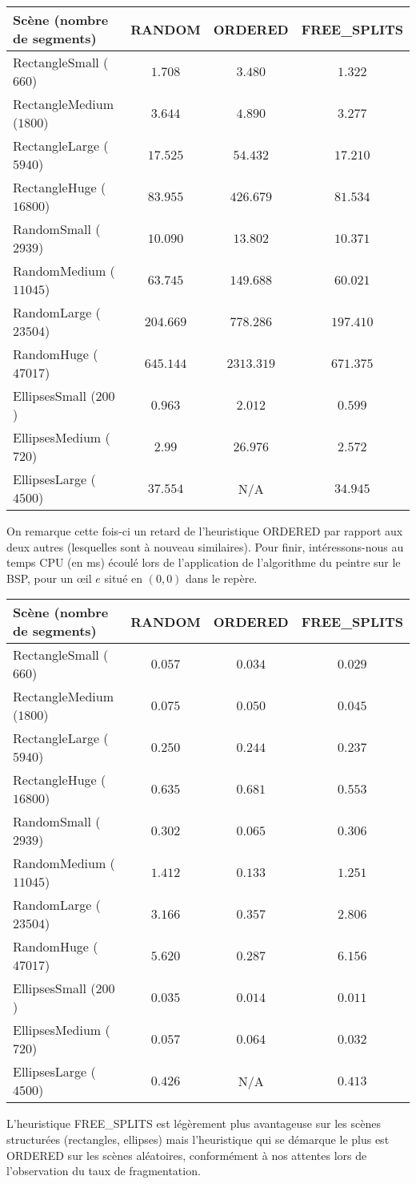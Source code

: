 \documentclass[11pts]{article}
\begin{document}
\begin{longtable}{|l|c|c|c|}
\hline
\textbf{Scène (nombre de segments)} & \textbf{RANDOM} & \textbf{ORDERED} & \textbf{FREE\_SPLITS}\\
\hline
RectangleSmall ($660$)&$1.708$&$3.480$&$1.322$\\
\hline
RectangleMedium ($1800$)&$3.644$&$4.890$&$3.277$\\
\hline
RectangleLarge ($5940$)&$17.525$&$54.432$&$17.210$\\
\hline
RectangleHuge ($16800$)&$83.955$&$426.679$&$81.534$\\
\hline
RandomSmall ($2939$)&$10.090$&$13.802$&$10.371$\\
\hline
RandomMedium ($11045$)&$63.745$&$149.688$&$60.021$\\
\hline
RandomLarge ($23504$)&$204.669$&$778.286$&$197.410$\\
\hline
RandomHuge ($47017$)&$645.144$&$2313.319$&$671.375$\\
\hline
EllipsesSmall ($200$)&$0.963$&$2.012$&$0.599$\\
\hline
EllipsesMedium ($720$)&$2.99$&$26.976$&$2.572$\\
\hline
EllipsesLarge ($4500$)&$37.554$&N/A&$34.945$\\
\hline
\end{longtable}
\noindent On remarque cette fois-ci un retard de l'heuristique ORDERED par rapport aux deux autres (lesquelles sont à nouveau similaires).
\newpage
\noindent Pour finir, intéressons-nous au temps CPU (en ms) écoulé lors de l'application de l'algorithme du peintre sur le BSP, pour un œil $e$ situé en $(0,0)$ dans le repère.
\begin{longtable}{|l|c|c|c|}
\hline
\textbf{Scène (nombre de segments)} & \textbf{RANDOM} & \textbf{ORDERED} & \textbf{FREE\_SPLITS}\\
\hline
RectangleSmall ($660$)&$0.057$&$0.034$&$0.029$\\
\hline
RectangleMedium ($1800$)&$0.075$&$0.050$&$0.045$\\
\hline
RectangleLarge ($5940$)&$0.250$&$0.244$&$0.237$\\
\hline
RectangleHuge ($16800$)&$0.635$&$0.681$&$0.553$\\
\hline
RandomSmall ($2939$)&$0.302$&$0.065$&$0.306$\\
\hline
RandomMedium ($11045$)&$1.412$&$0.133$&$1.251$\\
\hline
RandomLarge ($23504$)&$3.166$&$0.357$&$2.806$\\
\hline
RandomHuge ($47017$)&$5.620$&$0.287$&$6.156$\\
\hline
EllipsesSmall ($200$)&$0.035$&$0.014$&$0.011$\\
\hline
EllipsesMedium ($720$)&$0.057$&$0.064$&$0.032$\\
\hline
EllipsesLarge ($4500$)&$0.426$&N/A&$0.413$\\
\hline
\end{longtable}
\noindent L'heuristique FREE\_SPLITS est légèrement plus avantageuse sur les scènes structurées (rectangles, ellipses) mais l'heuristique qui se démarque le plus est ORDERED sur les scènes aléatoires, conformément à nos attentes lors de l'observation du taux de fragmentation.
\end{document}
